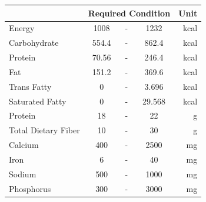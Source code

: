\documentclass{article}
\begin{document}
\begin{table}[ht]
\centering
\begin{tabular}{|l|ccc|r|}
\hline
\rowcolor[HTML]{C0C0C0} 
\multicolumn{1}{|c|}{\cellcolor[HTML]{C0C0C0}\textbf{Nutrient}} & \multicolumn{3}{c|}{\cellcolor[HTML]{C0C0C0}\textbf{Required Condition}} & \textbf{Unit} \\ \hline
Energy                                                          & 1008                 & -                & 1232                  & kcal          \\ \hline
Carbohydrate                                                    & 554.4                & -                & 862.4                 & kcal          \\ \hline
Protein                                                         & 70.56                & -                & 246.4                 & kcal          \\ \hline
Fat                                                             & 151.2                & -                & 369.6                 & kcal          \\ \hline
Trans Fatty                                                     & 0                    & -                & 3.696                 & kcal          \\ \hline
Saturated Fatty                                                 & 0                    & -                & 29.568                & kcal          \\ \hline
Protein                                                         & 18                   & -                & 22                    & g             \\ \hline
Total Dietary Fiber                                             & 10                   & -                & 30                    & g             \\ \hline
Calcium                                                         & 400                  & -                & 2500                  & mg            \\ \hline
Iron                                                            & 6                    & -                & 40                    & mg            \\ \hline
Sodium                                                          & 500                  & -                & 1000                  & mg            \\ \hline
Phosphorus                                                      & 300                  & -                & 3000                  & mg            \\ \hline

\end{tabular}
\end{table}
\end{document}
